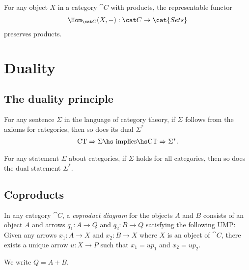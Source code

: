 \documentclass{article}
\begin{document}
\begin{corollary}[Awodey 2.22]
    For any object $X$ in a category $\cat C$ with products, the representable
    functor 
    \begin{align*}
        \Hom_{\cat C}(X, -) : \cat C \to \cat{Sets}
    \end{align*}
    preserves products.
\end{corollary}

\section{Duality}

\subsection{The duality principle}

\begin{proposition}
    For any sentence $\Sigma$ in the language of category theory,
    if $\Sigma$ follows from the axioms for categories, then so does
    its dual $\Sigma^*$
    \begin{align*}
        \text{CT}\Rightarrow \Sigma \text{\hs implies\hs} \text{CT}\Rightarrow \Sigma^*.
    \end{align*} 
\end{proposition}

\begin{proposition}
    For any statement $\Sigma$ about categories, if $\Sigma$ holds for all categories,
    then so does the dual statement $\Sigma^*$.
\end{proposition}

\subsection{Coproducts}

\begin{definition}
    In any category $\cat C$, a \emph{coproduct diagram} for the objects $A$ and $B$
    consists of an object $A$ and arrows $q_1:A\to Q$ and $q_2:B\to Q$ satisfying
    the following UMP: Given any arrows $x_1:A\to X$ and $x_2:B\to X$ where $X$ is an
    object of $\cat C$, there exists a unique arrow $u:X\to P$ such that $x_1=up_1$
    and $x_2=up_2$.
    \begin{center}
    \end{center}
    We write $Q=A+B$.
\end{definition}
\end{document}
